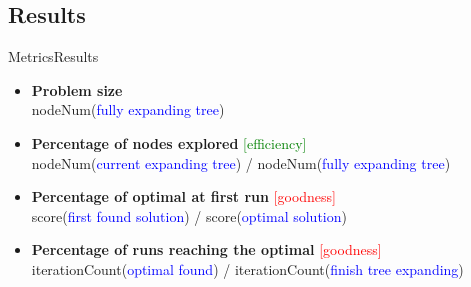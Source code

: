 \subsection{Results}

\begin{frame}{Metrics}{Results}

\begin{itemize}
\item \textbf{Problem size} \\
nodeNum(\textcolor{blue}{fully expanding tree}) 
\item \textbf{Percentage of nodes explored} \textcolor{green}{[efficiency]}\\
nodeNum(\textcolor{blue}{current expanding tree}) / nodeNum(\textcolor{blue}{fully expanding tree})
\item \textbf{Percentage of optimal at first run} \textcolor{red}{[goodness]}\\
score(\textcolor{blue}{first found solution}) / score(\textcolor{blue}{optimal solution})
\item \textbf{Percentage of runs reaching the optimal} \textcolor{red}{[goodness]}\\
iterationCount(\textcolor{blue}{optimal found}) / iterationCount(\textcolor{blue}{finish tree expanding})
\end{itemize}

\end{frame}


